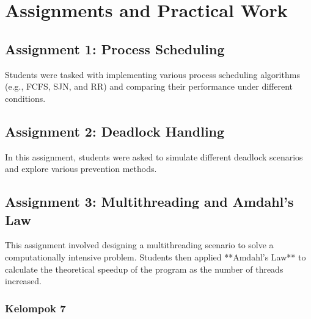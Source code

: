\documentclass[12pt]{article}
\begin{document}
\section{Assignments and Practical Work}
\subsection{Assignment 1: Process Scheduling}
Students were tasked with implementing various process scheduling algorithms (e.g., FCFS, SJN, and RR) and comparing their performance under different conditions.

\subsection{Assignment 2: Deadlock Handling}
In this assignment, students were asked to simulate different deadlock scenarios and explore various prevention methods.

\subsection{Assignment 3: Multithreading and Amdahl's Law}
This assignment involved designing a multithreading scenario to solve a computationally intensive problem. Students then applied **Amdahl's Law** to calculate the theoretical speedup of the program as the number of threads increased.
\subsubsection{Kelompok 7}
\end{document}
